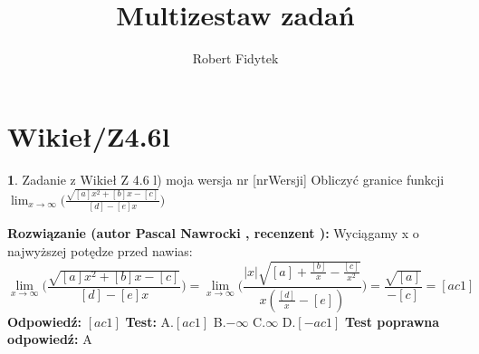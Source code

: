 \documentclass[12pt, a4paper]{article}
\title{Multizestaw zadań}
\author{Robert Fidytek}
\date{}
\theoremstyle{definition} %
\newtheorem{zad}{}
\newcommand{\kategoria}[1]{\section{#1}} %
\newcommand{\zadStart}[1]{\begin{zad}#1\newline} %
\newcommand{\zadStop}{\end{zad}}   %
\newcommand{\rozwStart}[2]{\noindent \textbf{Rozwiązanie (autor #1 , recenzent #2): }\newline} %
\newcommand{\rozwStop}{\newline}                                            %
\newcommand{\odpStart}{\noindent \textbf{Odpowiedź:}\newline}    %
\newcommand{\odpStop}{\newline}                                             %
\newcommand{\testStart}{\noindent \textbf{Test:}\newline} %
\newcommand{\testStop}{\newline} %
\newcommand{\kluczStart}{\noindent \textbf{Test poprawna odpowiedź:}\newline} %
\newcommand{\kluczStop}{\newline} %
\begin{document}
\maketitle


\kategoria{Wikieł/Z4.6l}
\zadStart{Zadanie z Wikieł Z 4.6 l) moja wersja nr [nrWersji]}
Obliczyć granice funkcji $\displaystyle{\lim_{x \to \infty}}\bigg(\frac{\sqrt{[a]x^2+[b]x-[c]}}{[d]-[e]x}\bigg)$
\zadStop
\rozwStart{Pascal Nawrocki}{}
Wyciągamy x o najwyższej potędze przed nawias:
$$\displaystyle{\lim_{x \to \infty}}\bigg(\frac{\sqrt{[a]x^2+[b]x-[c]}}{[d]-[e]x}\bigg)=\displaystyle{\lim_{x \to \infty}}\bigg(\frac{|x|\sqrt{[a]+\frac{[b]}{x}-\frac{[c]}{x^2}}}{x(\frac{[d]}{x}-[e])}\bigg)=\frac{\sqrt{[a]}}{-[c]}=[ac1]$$
\rozwStop
\odpStart
$[ac1]$
\odpStop
\testStart
A.$[ac1]$
B.$-\infty$
C.$\infty$
D.$[-ac1]$
\testStop
\kluczStart
A
\kluczStop
\end{document}
